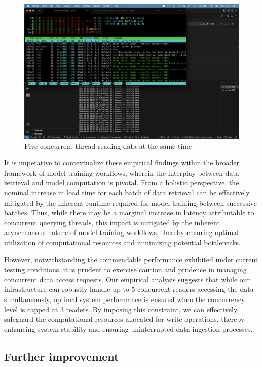 \begin{figure}[ht]
    \centering
    \includegraphics[width=0.8\linewidth]{Images/5-read-5-process-at-once.png}
    \vspace{1cm}
    \caption{Five concurrent thread reading data at the same time}
    \label{fig:concurrent-read}
\end{figure}

It is imperative to contextualize these empirical findings within the broader
framework of model training workflows, wherein the interplay between data
retrieval and model computation is pivotal. From a holistic perspective, the
nominal increase in load time for each batch of data retrieval can be
effectively mitigated by the inherent runtime required for model training
between successive batches. Thus, while there may be a marginal increase in
latency attributable to concurrent querying threads, this impact is mitigated by
the inherent asynchronous nature of model training workflows, thereby ensuring
optimal utilization of computational resources and minimizing potential
bottlenecks.

However, notwithstanding the commendable performance exhibited under current
testing conditions, it is prudent to exercise caution and prudence in managing
concurrent data access requests. Our empirical analysis suggests that while our
infrastructure can robustly handle up to 5 concurrent readers accessing the data
simultaneously, optimal system performance is ensured when the concurrency level
is capped at 3 readers. By imposing this constraint, we can effectively
safeguard the computational resources allocated for write operations, thereby
enhancing system stability and ensuring uninterrupted data ingestion processes.


\subsection{Further improvement}

